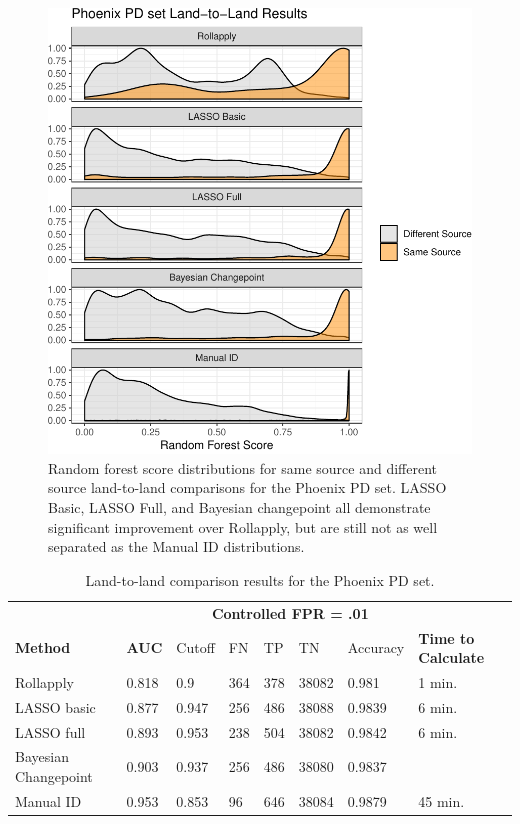 \documentclass[12pt]{article}
\begin{document}
\begin{figure}
\centering
\includegraphics{writeup_files/figure-latex/phoenix-groove-results-1.pdf}
\caption{\label{phoenix-groove-results}Random forest score distributions
for same source and different source land-to-land comparisons for the
Phoenix PD set. LASSO Basic, LASSO Full, and Bayesian changepoint all
demonstrate significant improvement over Rollapply, but are still not as
well separated as the Manual ID distributions.}
\end{figure}

\begin{table}[]
\centering
\begin{tabular}{llllllll}
& & \multicolumn{5}{c}{\textbf{Controlled FPR = .01}} & \\
\textbf{Method} & \textbf{AUC} & Cutoff & FN &TP & TN & Accuracy & \textbf{Time to Calculate} \\ \hline
Rollapply & 0.818 &  0.9 & 364 & 378&38082 & 0.981& 1 min. \\ \hline
LASSO basic & 0.877 &  0.947 &256 & 486&38088 & 0.9839 & 6 min. \\ \hline
LASSO full & 0.893 &  0.953 &238 &504 &38082 & 0.9842  & 6 min. \\ \hline
Bayesian Changepoint & 0.903 &  0.937 &256 & 486&38080 & 0.9837 &  \\ \hline
Manual ID & 0.953 &  0.853 & 96& 646&38084 & 0.9879 & 45 min. \\ \hline 
\end{tabular}
\caption{Land-to-land comparison results for the Phoenix PD set.}
\label{phoenix-table}
\end{table}
\end{document}
